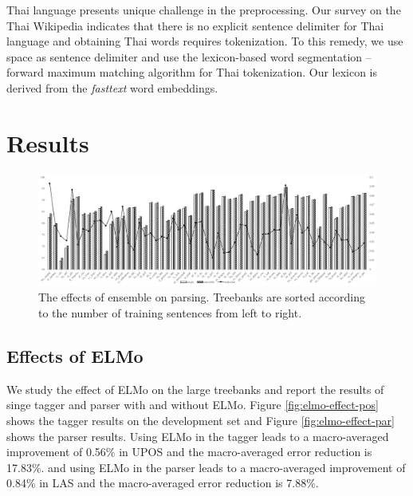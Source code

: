 \documentclass[11pt,a4paper]{article}
\begin{document}
Thai language presents unique challenge in the preprocessing.
Our survey on the Thai Wikipedia indicates that there is no explicit sentence delimiter for Thai language
and obtaining Thai words requires tokenization.
To this remedy, we use space as sentence delimiter and
use the lexicon-based word segmentation -- forward maximum matching algorithm
for Thai tokenization.
Our lexicon is derived from the \textit{fasttext} word embeddings.

\section{Results}
\begin{figure}[t]
	\includegraphics[width=\textwidth]{effects_elmo_ensemble}
	\caption{The effects of ensemble on parsing.
		Treebanks are sorted according to the number of training sentences from left to right.}\label{fig:elmo-effect-ens}
\end{figure}

%

\subsection{Effects of ELMo}

We study the effect of ELMo on the large treebanks and report
the results of singe tagger and parser with and without ELMo.
Figure \ref{fig:elmo-effect-pos} shows the tagger results on the development set
and Figure \ref{fig:elmo-effect-par} 
shows the parser results.
Using ELMo in the tagger leads to a macro-averaged improvement of 0.56\% in UPOS
and the macro-averaged error reduction is 17.83\%.
and using ELMo in the parser leads to a macro-averaged improvement 
of 0.84\% in LAS and
the macro-averaged error reduction is 7.88\%.
\end{document}
